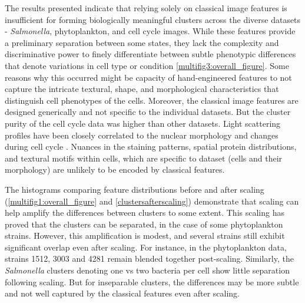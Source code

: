 \documentclass[12pt,a4paper]{article}
\begin{document}
The results presented indicate that relying solely on classical image features is insufficient for forming biologically meaningful clusters across the diverse datasets - \textit{Salmonella}, phytoplankton, and cell cycle images. While these features provide a preliminary separation between some states, they lack the complexity and discriminative power to finely differentiate between subtle phenotypic differences that denote variations in cell type or condition \ref{multifig3:overall_figure}. Some reasons why this occurred might be capacity of hand-engineered features to not capture the intricate textural, shape, and morphological characteristics that distinguish cell phenotypes of the cells. Moreover, the classical image features are designed generically and not specific to the individual datasets. But the cluster purity of the cell cycle data was higher than other datasets. Light scattering profiles have been closely correlated to the nuclear morphology and changes during cell cycle \cite{WOS:A1974T155500001, benson_mcdougal_coffey_1984}. Nuances in the staining patterns, spatial protein distributions, and textural motifs within cells, which are specific to dataset (cells and their morphology) are unlikely to be encoded by classical features.

The histograms comparing feature distributions before and after scaling (\ref{multifig1:overall_figure} and \ref{clustersafterscaling}) demonstrate that scaling can help amplify the differences between clusters to some extent. This scaling has proved that the clusters can be separated, in the case of some phytoplankton strains. However, this amplification is modest, and several strains still exhibit significant overlap even after scaling. For instance, in the phytoplankton data, strains 1512, 3003 and 4281 remain blended together post-scaling. Similarly, the \textit{Salmonella} clusters denoting one vs two bacteria per cell show little separation following scaling. But for inseparable clusters, the differences may be more subtle and not well captured by the classical features even after scaling.
\end{document}
